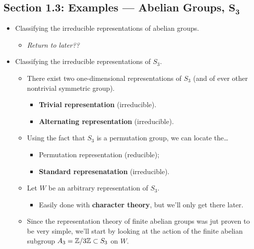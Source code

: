 \documentclass[../notes.tex]{subfiles}
\begin{document}
\subsection*{Section 1.3: Examples --- Abelian Groups, $\bm{S_3}$}
\begin{itemize}
    \item Classifying the irreducible representations of abelian groups.
    \begin{itemize}
        \item \emph{Return to later??}
    \end{itemize}
    \item Classifying the irreducible representations of $S_3$.
    \begin{itemize}
        \item There exist two one-dimensional representations of $S_3$ (and of ever other nontrivial symmetric group).
        \begin{itemize}
            \item \textbf{Trivial representation} (irreducible).
            \item \textbf{Alternating representation} (irreducible).
        \end{itemize}
        \item Using the fact that $S_3$ is a permutation group, we can locate the\dots
        \begin{itemize}
            \item Permutation representation (reducible);
            \item \textbf{Standard represenatation} (irreducible).
        \end{itemize}
        \item Let $W$ be an arbitrary representation of $S_3$.
        \begin{itemize}
            \item Easily done with \textbf{character theory}, but we'll only get there later.
        \end{itemize}
        \item Since the representation theory of finite abelian groups was jut proven to be very simple, we'll start by looking at the action of the finite abelian subgroup $A_3=\mathbb{Z}/3\mathbb{Z}\subset S_3$ on $W$.
        \begin{itemize}

\end{itemize}
\end{itemize}
\end{itemize}
\end{document}
